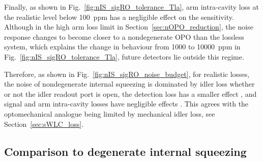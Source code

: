 Finally, as shown in Fig.~\ref{fig:nIS_sigRO_tolerance_Tla}, arm intra-cavity loss at the realistic level below 100~ppm has a negligible  effect on the sensitivity. Although in the high arm loss limit in Section~\ref{sec:nOPO_reduction}, the noise response changes to become closer to a nondegenerate OPO than the lossless system, which explains the change in behaviour from 1000 to 10000~ppm  in Fig.~\ref{fig:nIS_sigRO_tolerance_Tla}, future detectors lie outside this regime. 

Therefore, as shown in Fig.~\ref{fig:nIS_sigRO_noise_budget}, for realistic losses, the noise of nondegenerate internal squeezing is dominated by idler loss whether or not the idler readout port is open, the detection loss has a smaller effect , and signal and arm intra-cavity losses have negligible effects . This agrees with the optomechanical analogue being limited by mechanical idler loss, see Section~\ref{sec:sWLC_loss}. 

\subsection{Comparison to degenerate internal squeezing}

